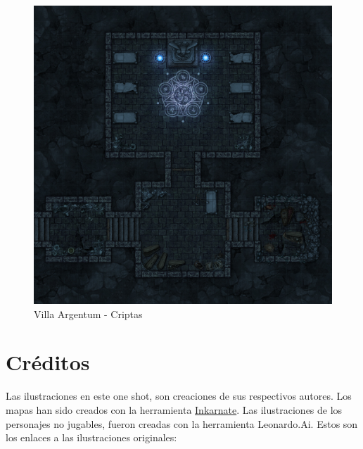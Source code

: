 \documentclass[10pt,twoside,twocolumn,openany]{dndbook}
\begin{document}
\begin{figure}[hb!]
  \centering
  \includegraphics[width=\textwidth]{maps/villa-argentum-s2.jpg}
  \caption{Villa Argentum - Criptas}
  \label{fig:vas2full}
\end{figure}




\section{Créditos}

Las ilustraciones en este one shot, son creaciones de sus respectivos autores. Los mapas han sido 
creados con la herramienta \href{https://inkarnate.com/}{Inkarnate}. Las ilustraciones de los 
personajes no jugables, fueron creadas con la herramienta Leonardo.Ai. Estos son los enlaces a las 
ilustraciones originales:
\end{document}
